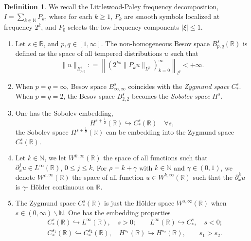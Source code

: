 \documentclass[12pt]{amsart}
\theoremstyle{definition}
\newtheorem{definition}[theorem]{Definition}
\numberwithin{equation}{section}
\begin{document}
\begin{definition}
We recall the  Littlewood-Paley frequency decomposition, $ I = \sum_{k\in \mathbb{N}} P_k$, where for each $k\geq 1$, $P_k$ are smooth symbols  localized at  frequency $2^k$,  and $P_0$ selects the low frequency components $|\xi|\leq 1$.
\begin{enumerate}
\item Let $s\in \mathbb{R}$, and $p,q \in [1, \infty]$.
The non-homogeneous Besov space $B^s_{p,q}(\mathbb{R})$ is defined as the space of all tempered distributions $u$ such that
\begin{equation*}
\| u\|_{B^s_{p,q}} : = \left\|(2^{ks}\|P_k u \|_{L^p})_{k=0}^\infty \right\|_{l^q} < +\infty.
\end{equation*}
\item When $p = q = \infty$, Besov space $B^s_{\infty, \infty}$ coincides with the \textit{Zygmund space} $C^s_{*}$.
When $p = q =2$, the Besov space $B^s_{2,2}$ becomes the \textit{Sobolev space} $H^s$.
\item One has the Sobolev embedding, 
\begin{equation}
 H^{s+\frac{1}{2}}(\mathbb{R}) \hookrightarrow C^s_{*}(\mathbb{R}) \quad \forall s, \label{HsCsEmbed}
\end{equation}
the Sobolev space $H^{s+\frac{1}{2}}(\mathbb{R})$ can be embedding into the Zygmund space $C^s_{*}(\mathbb{R})$.
\item Let $k\in \mathbb{N}$, we let $W^{k,\infty}(\mathbb{R})$ the space of all functions such that $\partial_x^j u \in L^\infty(\mathbb{R})$, $0\leq j \leq k$. 
For $\rho = k+ \gamma$ with $k\in \mathbb{N}$ and $\gamma \in (0,1)$, we denote $W^{\rho, \infty}(\mathbb{R})$  the
space of all function $u\in W^{k,\infty}(\mathbb{R})$ such that the $\partial_x^k u$ is $\gamma$- H\"{o}lder continuous on $\mathbb{R}$. 
\item The Zygmund space $C^s_{*}(\mathbb{R})$ is just the H\"{o}lder space $W^{s, \infty}(\mathbb{R})$ when $s\in (0,\infty)\backslash \mathbb{N}$.
One has the embedding properties
\begin{align*}
  &C_{*}^s(\mathbb{R}) \hookrightarrow L^\infty(\mathbb{R}), \quad s>0; \qquad L^\infty(\mathbb{R}) \hookrightarrow C_{*}^s, \quad s<0;\\
  &C_{*}^{s_1}(\mathbb{R})\hookrightarrow C_{*}^{s_2}(\mathbb{R}), \quad H^{s_1}(\mathbb{R})\hookrightarrow H^{s_2}(\mathbb{R}), \qquad s_1>s_2.
\end{align*}
\end{enumerate}
\end{definition}
\end{document}
